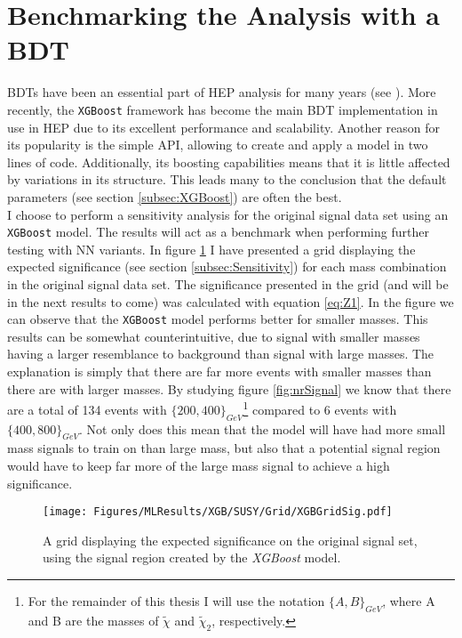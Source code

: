 \section{Benchmarking the Analysis with a BDT}\label{sec:XGBoost}
\ac{BDT}s have been an essential part of \acf{HEP} analysis for many years (see 
\cite{ATLAS-CONF-2011-152,ATLAS-CONF-2017-064}). More recently, the \verb!XGBoost! 
framework has become the main \ac{BDT} implementation in use in \ac{HEP} due 
to its excellent performance and scalability. Another reason for its popularity is the simple \acf{API}, allowing 
to create and apply a model in two lines of code. Additionally, its boosting capabilities means 
that it is little affected by variations in its structure. This leads many to the conclusion that the default 
parameters (see section \ref{subsec:XGBoost}) are often the best. 
\\
I choose to perform a sensitivity analysis for the original signal data set using an \verb!XGBoost! model. The results
will act as a benchmark when performing further testing with \ac{NN} variants. In figure \ref{fig:XGBoost} 
I have presented a grid displaying the expected significance (see section \ref{subsec:Sensitivity}) for each 
mass combination in the original signal data set. The significance presented in the grid (and will be in the next results to come) 
was calculated with equation \ref{eq:Z1}. In the figure we can observe that the \verb!XGBoost! model performs
better for smaller masses. This results can be somewhat counterintuitive, due to signal with smaller masses 
having a larger resemblance to background than signal with large masses. The explanation is simply that there are
far more events with smaller masses than there are with larger masses. By studying figure \ref{fig:nrSignal} we know that 
there are a total of 134 events with $\{200,400\}_{GeV}$\footnote{For the remainder of this thesis I will use the notation $\{A,B\}_{GeV}$, 
where A and B are the masses of $\tilde{\chi}$ and $\tilde{\chi}_2$, respectively.} compared to 6 events 
with $\{400,800\}_{GeV}$. Not only does this mean that the model will have had more small mass signals to 
train on than large mass, but also that a potential signal region would have to keep far more of the large 
mass signal to achieve a high significance.\\
\begin{figure}
    \centering
    \texttt{[image: Figures/MLResults/XGB/SUSY/Grid/XGBGridSig.pdf]}
    \caption{A grid displaying the expected significance on the original signal set, using the signal region 
    created by the \emph{XGBoost} model.}
    \label{fig:XGBoost}
\end{figure}
